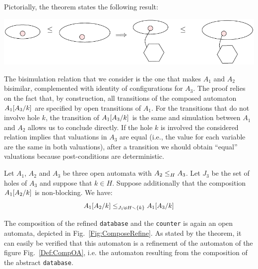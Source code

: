 \documentclass[runningheads]{llncs}
\begin{document}
Pictorially, the theorem states the following result:

\begin{center}
\includegraphics[scale=0.7]{Figures/Thm2intuition}
\end{center}

%
%
%
%


The bisimulation relation that we consider is the one that makes $A_1$ and $A_2$ bisimilar, complemented with identity of configurations for $A_3$.
The proof relies on the fact that, by construction, all transitions of the composed automaton $A_1\subst{A_3}{k}$ are specified by open transitions of $A_1$. For the transitions that do not involve hole $k$, the transition of $A_1\subst{A_3}{k}$ is the same and simulation between $A_1$ and $A_2$ allows us to conclude directly. If the hole $k$ is involved the considered relation  implies that valuations in $A_3$ are equal (i.e., the value for each variable are the same in both valuations), after a transition we should obtain ``equal'' valuations because post-conditions are deterministic.



\begin{theorem}[Congruence]
Let $A_1$, $A_2$ and $A_3$ be three open automata with $\wrel{A_2}{A_3}{H}$. 
  Let $J_3$ be the set of holes of $A_3$ and suppose that \(k \in H\). Suppose additionally that the composition $A_1\subst{A_2}{k}$ is non-blocking.
We have: \[\wrel{A_1\subst{A_2}{k}}{A_1\subst{A_3}{k}}{J_1 \uplus H \setminus \mbrc{k}}\]
\end{theorem}




\begin{example} 

The composition of the refined \texttt{database} and the \texttt{counter} is again an open automata, depicted in Fig.~\ref{Fig:ComposeRefine}. As stated by the theorem,  it can easily be verified that this automaton is a refinement of the automaton of the figure Fig.~\ref{Def:CompOA}, i.e. the automaton resulting from the composition of the abstract \texttt{database}.
\end{example}
\end{document}
